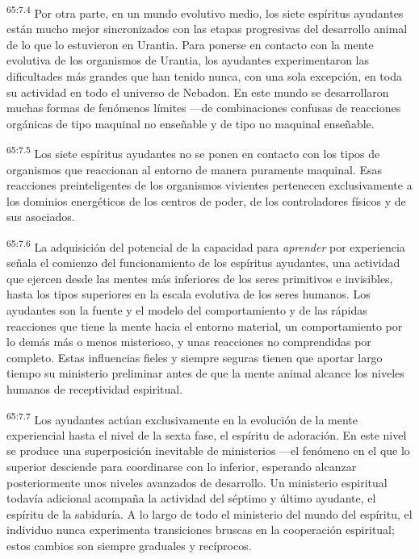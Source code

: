 \par
\textsuperscript{65:7.4} Por otra parte, en un mundo evolutivo medio, los siete espíritus ayudantes están mucho mejor sincronizados con las etapas progresivas del desarrollo animal de lo que lo estuvieron en Urantia. Para ponerse en contacto con la mente evolutiva de los organismos de Urantia, los ayudantes experimentaron las dificultades más grandes que han tenido nunca, con una sola excepción, en toda su actividad en todo el universo de Nebadon. En este mundo se desarrollaron muchas formas de fenómenos límites ---de combinaciones confusas de reacciones orgánicas de tipo maquinal no enseñable y de tipo no maquinal enseñable.

\par
\textsuperscript{65:7.5} Los siete espíritus ayudantes no se ponen en contacto con los tipos de organismos que reaccionan al entorno de manera puramente maquinal. Esas reacciones preinteligentes de los organismos vivientes pertenecen exclusivamente a los dominios energéticos de los centros de poder, de los controladores físicos y de sus asociados.

\par
\textsuperscript{65:7.6} La adquisición del potencial de la capacidad para \textit{aprender} por experiencia señala el comienzo del funcionamiento de los espíritus ayudantes, una actividad que ejercen desde las mentes más inferiores de los seres primitivos e invisibles, hasta los tipos superiores en la escala evolutiva de los seres humanos. Los ayudantes son la fuente y el modelo del comportamiento y de las rápidas reacciones que tiene la mente hacia el entorno material, un comportamiento por lo demás más o menos misterioso, y unas reacciones no comprendidas por completo. Estas influencias fieles y siempre seguras tienen que aportar largo tiempo su ministerio preliminar antes de que la mente animal alcance los niveles humanos de receptividad espiritual.

\par
\textsuperscript{65:7.7} Los ayudantes actúan exclusivamente en la evolución de la mente experiencial hasta el nivel de la sexta fase, el espíritu de adoración. En este nivel se produce una superposición inevitable de ministerios ---el fenómeno en el que lo superior desciende para coordinarse con lo inferior, esperando alcanzar posteriormente unos niveles avanzados de desarrollo. Un ministerio espiritual todavía adicional acompaña la actividad del séptimo y último ayudante, el espíritu de la sabiduría. A lo largo de todo el ministerio del mundo del espíritu, el individuo nunca experimenta transiciones bruscas en la cooperación espiritual; estos cambios son siempre graduales y recíprocos.

